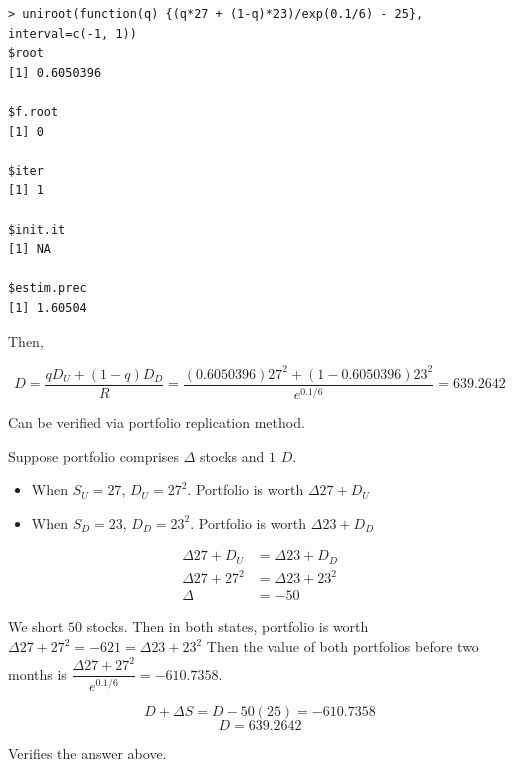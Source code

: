 \documentclass[11pt]{scrartcl}
\begin{document}
\begin{lstlisting}
> uniroot(function(q) {(q*27 + (1-q)*23)/exp(0.1/6) - 25}, interval=c(-1, 1))
$root
[1] 0.6050396

$f.root
[1] 0

$iter
[1] 1

$init.it
[1] NA

$estim.prec
[1] 1.60504
\end{lstlisting}

Then,

\[D = \frac{qD_U + (1-q)D_D}{R} = \frac{(0.6050396)27^2 + (1-0.6050396)23^2}{e^{0.1/6}} = 639.2642\]

Can be verified via portfolio replication method.

Suppose portfolio comprises $\Delta$ stocks and $1$ $D$.

\begin{itemize}
\item When $S_U = 27$, $D_U = 27^2$. Portfolio is worth $\Delta 27 + D_U$
\item When $S_D = 23$, $D_D = 23^2$. Portfolio is worth $\Delta 23 + D_D$
\end{itemize}

\begin{align*}
\Delta 27 + D_U &= \Delta 23 + D_D \\
\Delta 27 + 27^2 &= \Delta 23 + 23^2 \\
\Delta &= -50
\end{align*}

We short $50$ stocks. Then in both states, portfolio is worth $\Delta 27 + 27^2 = -621 = \Delta 23 + 23^2$ Then the value of both portfolios before two months is $\dfrac{\Delta 27 + 27^2}{e^{0.1/6}} = -610.7358$.

\[D + \Delta S = D -50(25) = -610.7358\]
\[D = 639.2642\]

Verifies the answer above.
\end{document}
